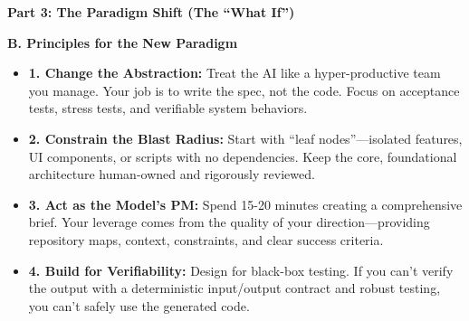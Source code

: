 \documentclass[
  ignorenonframetext,
  aspectratio=169,
]{beamer}
\providecommand{\tightlist}{%
  \setlength{\itemsep}{0pt}\setlength{\parskip}{0pt}}
\begin{document}
\begin{frame}{\textbf{Part 3: The Paradigm Shift (The ``What If'')}}
\begin{block}{\textbf{B. Principles for the New Paradigm}}
\label{b.-principles-for-the-new-paradigm}
\begin{itemize}
\tightlist
\item
  \textbf{1. Change the Abstraction:} Treat the AI like a
  hyper-productive team you manage. Your job is to write the spec, not
  the code. Focus on acceptance tests, stress tests, and verifiable
  system behaviors.\\
\item
  \textbf{2. Constrain the Blast Radius:} Start with ``leaf
  nodes''---isolated features, UI components, or scripts with no
  dependencies. Keep the core, foundational architecture human-owned and
  rigorously reviewed.\\
\item
  \textbf{3. Act as the Model's PM:} Spend 15-20 minutes creating a
  comprehensive brief. Your leverage comes from the quality of your
  direction---providing repository maps, context, constraints, and clear
  success criteria.\\
\item
  \textbf{4. Build for Verifiability:} Design for black-box testing. If
  you can't verify the output with a deterministic input/output contract
  and robust testing, you can't safely use the generated code.
\end{itemize}
\end{block}
\end{frame}
\end{document}
